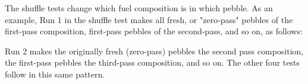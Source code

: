

The shuffle tests change which fuel composition is in which pebble.  As an example, Run 1 in the shuffle test makes all fresh, or "zero-pass" pebbles of the first-pass composition, first-pass pebbles of the second-pass, and so on, as follows:



Run 2 makes the originally fresh (zero-pass) pebbles the second pass composition, the first-pass pebbles the third-pass composition, and so on.  The other four tests follow in this same pattern.